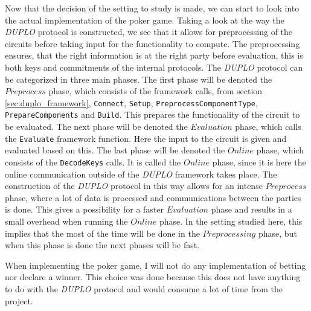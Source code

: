 \documentclass[twoside,11pt,openright]{report}
\newcommand{\DUPLO}{\textit{DUPLO} }
\begin{document}
Now that the decision of the setting to study is made, we can start to look into the actual implementation of the poker game. Taking a look at the way the \DUPLO protocol is constructed, we see that it allows for preprocessing of the circuits before taking input for the functionality to compute. The preprocessing ensures, that the right information is at the right party before evaluation, this is both keys and commitments of the internal protocols. The \DUPLO protocol can be categorized in three main phases. The first phase will be denoted the $Preprocess$ phase, which consists of the framework calls, from section \ref{sec:duplo_framework}, \verb|Connect|, \verb|Setup|, \verb|PreprocessComponentType|, \verb|PrepareComponents| and \verb|Build|. This prepares the functionality of the circuit to be evaluated. The next phase will be denoted the $Evaluation$ phase, which calls the \verb|Evaluate| framework function. Here the input to the circuit is given and evaluated based on this. The last phase will be denoted the $Online$ phase, which consists of the \verb|DecodeKeys| calls. It is called the $Online$ phase, since it is here the online communication outside of the \DUPLO framework takes place. The construction of the \DUPLO protocol in this way allows for an intense $Preprocess$ phase, where a lot of data is processed and communications between the parties is done. This gives a possibility for a faster $Evaluation$ phase and results in a small overhead when running the $Online$ phase. In the setting studied here, this implies that the most of the time will be done in the $Preprocessing$ phase, but when this phase is done the next phases will be fast.

When implementing the poker game, I will not do any implementation of betting nor declare a winner. This choice was done because this does not have anything to do with the \DUPLO protocol and would consume a lot of time from the project.

\bigskip
\end{document}

